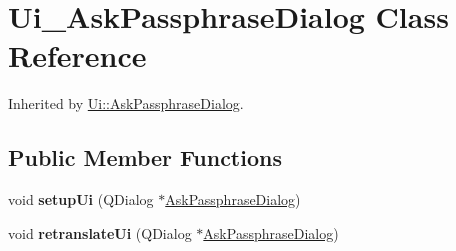 \hypertarget{class_ui___ask_passphrase_dialog}{}\section{Ui\+\_\+\+Ask\+Passphrase\+Dialog Class Reference}
\label{class_ui___ask_passphrase_dialog}


Inherited by \mbox{\hyperlink{class_ui_1_1_ask_passphrase_dialog}{Ui\+::\+Ask\+Passphrase\+Dialog}}.

\subsection*{Public Member Functions}
\begin{DoxyCompactItemize}
\item 
\mbox{\label{class_ui___ask_passphrase_dialog_a8fc761ce30a0e8c7302d866a29b52e82}} 
void {\bfseries setup\+Ui} (Q\+Dialog $\ast$\mbox{\hyperlink{class_ask_passphrase_dialog}{Ask\+Passphrase\+Dialog}})
\item 
\mbox{\label{class_ui___ask_passphrase_dialog_a9a5864d9a2192e319f8f469fc0cc528b}} 
void {\bfseries retranslate\+Ui} (Q\+Dialog $\ast$\mbox{\hyperlink{class_ask_passphrase_dialog}{Ask\+Passphrase\+Dialog}})
\end{DoxyCompactItemize}
